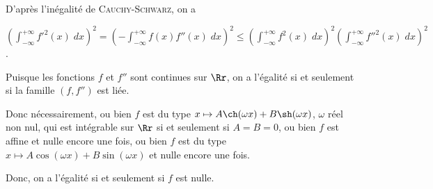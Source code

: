 {{D'après l'inégalité de \textsc{Cauchy}-\textsc{Schwarz}, on a

\begin{center}
$\left(\int_{-\infty}^{+\infty}f'^2(x)\;dx\right)^2=\left(-\int_{-\infty}^{+\infty}f(x)f''(x)\;dx\right)^2\leqslant\left(\int_{-\infty}^{+\infty}f^2(x)\;dx\right)^2\left(\int_{-\infty}^{+\infty}f''^2(x)\;dx\right)^2$.
\end{center}

Puisque les fonctions $f$ et $f''$ sont continues sur $\Rr$, on a l'égalité si et seulement si la famille $(f,f'')$ est liée.

Donc nécessairement, ou bien $f$ est du type $x\mapsto A\ch(\omega x)+ B\sh(\omega x)$, $\omega$ réel non nul, qui est intégrable sur $\Rr$ si et seulement si $A = B = 0$, ou bien $f$ est affine et nulle encore une fois, ou bien $f$ est du type $x\mapsto A\cos(\omega x)+ B\sin(\omega x)$ et nulle encore une fois.

Donc, on a l'égalité si et seulement si $f$ est nulle.}
}